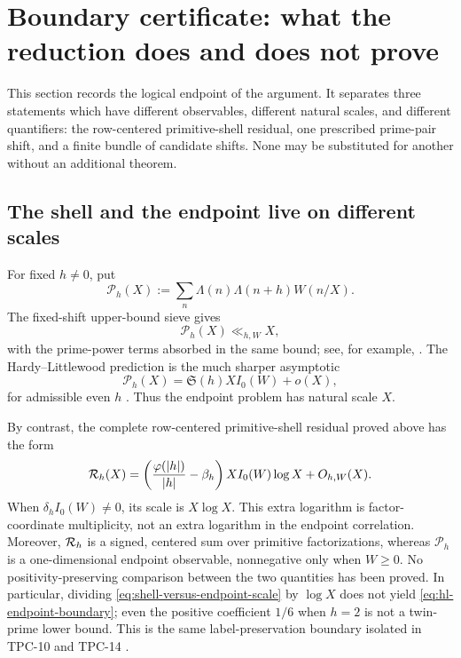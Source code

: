 \section{Boundary certificate: what the reduction does and does not prove}
\label{sec:boundary-certificate}

This section records the logical endpoint of the argument.  It separates
three statements which have different observables, different natural
scales, and different quantifiers: the row-centered primitive-shell
residual, one prescribed prime-pair shift, and a finite bundle of candidate
shifts.  None may be
substituted for another without an additional theorem.

\subsection{The shell and the endpoint live on different scales}

For fixed $h\ne0$, put
\[
 \mathcal P_h(X):=\sum_n\Lambda(n)\Lambda(n+h)W(n/X).
\]
The fixed-shift upper-bound sieve gives
\begin{equation}
 \mathcal P_h(X)\ll_{h,W}X,
 \label{eq:endpoint-upper-scale}
\end{equation}
with the prime-power terms absorbed in the same bound; see, for example,
\citet{IwaniecKowalski2004}.  The Hardy--Littlewood prediction is the much
sharper asymptotic
\begin{equation}
 \mathcal P_h(X)=\mathfrak S(h)XI_0(W)+o(X),
 \label{eq:hl-endpoint-boundary}
\end{equation}
for admissible even $h$ \citep{HardyLittlewood1923}.  Thus the endpoint
problem has natural scale $X$.

By contrast, the complete row-centered primitive-shell residual proved
above has the
form
\begin{equation}
 \mathcal R_h(X)
 =\left(\frac{\varphi(|h|)}{|h|}-\beta_h\right)
   XI_0(W)\log X+O_{h,W}(X).
 \label{eq:shell-versus-endpoint-scale}
\end{equation}
When $\delta_hI_0(W)\ne0$, its scale is $X\log X$.  This extra logarithm is factor-coordinate
multiplicity, not an extra logarithm in the endpoint correlation.
Moreover, $\mathcal R_h$ is a signed, centered sum over primitive
factorizations, whereas $\mathcal P_h$ is a one-dimensional endpoint
observable, nonnegative only when $W\geq0$.  No positivity-preserving comparison between the two quantities
has been proved.  In particular, dividing
\eqref{eq:shell-versus-endpoint-scale} by $\log X$ does not yield
\eqref{eq:hl-endpoint-boundary}; even the positive coefficient $1/6$ when
$h=2$ is not a twin-prime lower bound.  This is the same label-preservation
boundary isolated in TPC-10 and TPC-14
\citep{WangTPC10,WangTPC14}.

